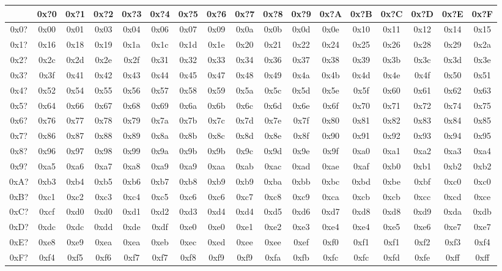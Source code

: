 {\ttfamily
\begin{tabular}{|c|c|c|c|c|c|c|c|c|c|c|c|c|c|c|c|c|}
\hline
& 0x?0 & 0x?1 & 0x?2 & 0x?3 & 0x?4 & 0x?5 & 0x?6 & 0x?7 & 0x?8 & 0x?9 & 0x?A & 0x?B & 0x?C & 0x?D & 0x?E & 0x?F \\
\hline
0x0? & 0x00 & 0x01 & 0x03 & 0x04 & 0x06 & 0x07 & 0x09 & 0x0a &
0x0b & 0x0d & 0x0e & 0x10 & 0x11 & 0x12 & 0x14 & 0x15 \\
0x1? & 0x16 & 0x18 & 0x19 & 0x1a & 0x1c & 0x1d & 0x1e & 0x20 &
0x21 & 0x22 & 0x24 & 0x25 & 0x26 & 0x28 & 0x29 & 0x2a \\
0x2? & 0x2c & 0x2d & 0x2e & 0x2f & 0x31 & 0x32 & 0x33 & 0x34 &
0x36 & 0x37 & 0x38 & 0x39 & 0x3b & 0x3c & 0x3d & 0x3e \\
0x3? & 0x3f & 0x41 & 0x42 & 0x43 & 0x44 & 0x45 & 0x47 & 0x48 &
0x49 & 0x4a & 0x4b & 0x4d & 0x4e & 0x4f & 0x50 & 0x51 \\
0x4? & 0x52 & 0x54 & 0x55 & 0x56 & 0x57 & 0x58 & 0x59 & 0x5a &
0x5c & 0x5d & 0x5e & 0x5f & 0x60 & 0x61 & 0x62 & 0x63 \\
0x5? & 0x64 & 0x66 & 0x67 & 0x68 & 0x69 & 0x6a & 0x6b & 0x6c &
0x6d & 0x6e & 0x6f & 0x70 & 0x71 & 0x72 & 0x74 & 0x75 \\
0x6? & 0x76 & 0x77 & 0x78 & 0x79 & 0x7a & 0x7b & 0x7c & 0x7d &
0x7e & 0x7f & 0x80 & 0x81 & 0x82 & 0x83 & 0x84 & 0x85 \\
0x7? & 0x86 & 0x87 & 0x88 & 0x89 & 0x8a & 0x8b & 0x8c & 0x8d &
0x8e & 0x8f & 0x90 & 0x91 & 0x92 & 0x93 & 0x94 & 0x95 \\
0x8? & 0x96 & 0x97 & 0x98 & 0x99 & 0x9a & 0x9b & 0x9b & 0x9c &
0x9d & 0x9e & 0x9f & 0xa0 & 0xa1 & 0xa2 & 0xa3 & 0xa4 \\
0x9? & 0xa5 & 0xa6 & 0xa7 & 0xa8 & 0xa9 & 0xa9 & 0xaa & 0xab &
0xac & 0xad & 0xae & 0xaf & 0xb0 & 0xb1 & 0xb2 & 0xb2 \\
0xA? & 0xb3 & 0xb4 & 0xb5 & 0xb6 & 0xb7 & 0xb8 & 0xb9 & 0xb9 &
0xba & 0xbb & 0xbc & 0xbd & 0xbe & 0xbf & 0xc0 & 0xc0 \\
0xB? & 0xc1 & 0xc2 & 0xc3 & 0xc4 & 0xc5 & 0xc6 & 0xc6 & 0xc7 &
0xc8 & 0xc9 & 0xca & 0xcb & 0xcb & 0xcc & 0xcd & 0xce \\
0xC? & 0xcf & 0xd0 & 0xd0 & 0xd1 & 0xd2 & 0xd3 & 0xd4 & 0xd4 &
0xd5 & 0xd6 & 0xd7 & 0xd8 & 0xd8 & 0xd9 & 0xda & 0xdb \\
0xD? & 0xdc & 0xdc & 0xdd & 0xde & 0xdf & 0xe0 & 0xe0 & 0xe1 &
0xe2 & 0xe3 & 0xe4 & 0xe4 & 0xe5 & 0xe6 & 0xe7 & 0xe7 \\
0xE? & 0xe8 & 0xe9 & 0xea & 0xea & 0xeb & 0xec & 0xed & 0xee &
0xee & 0xef & 0xf0 & 0xf1 & 0xf1 & 0xf2 & 0xf3 & 0xf4 \\
0xF? & 0xf4 & 0xf5 & 0xf6 & 0xf7 & 0xf7 & 0xf8 & 0xf9 & 0xf9 &
0xfa & 0xfb & 0xfc & 0xfc & 0xfd & 0xfe & 0xff & 0xff \\
\hline
\end{tabular}
}

